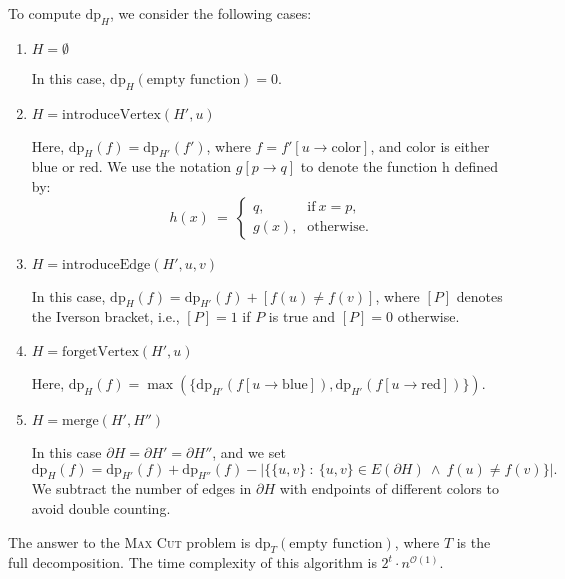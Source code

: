 \documentclass[12pt]{article}
\begin{document}
	\medskip
	
	To compute \(\text{dp}_{H}\), we consider the following cases:
	\begin{enumerate}
		\item \(H = \emptyset\)
		      
		      In this case, \(\text{dp}_{H}(\text{empty function}) = 0\).
		
		\item \(H = \text{introduceVertex}(H', u)\)
		      
		      Here, \(\text{dp}_{H}(f) = \text{dp}_{H'}(f')\), where \(f =
		      f'[u \to \text{color}]\), and color is either blue or red. We use
		      the notation \(g[p \to q]\) to denote the function h defined by:
		      \[ h(x) \ = \ \begin{cases} q \text{,} & \text{if} \ x = p
		      \text{,} \\
		      g(x) \text{,} & \text{otherwise.} \end{cases} \]
		
		\item \(H = \text{introduceEdge}(H', u, v)\)
		      
		      In this case, \(\text{dp}_{H}(f) = \text{dp}_{H'}(f) + [f(u) \neq
		      f(v)]\), where \([P]\) denotes the Iverson bracket, i.e., \([P] =
		      1\) if \(P\) is true and \([P] = 0\) otherwise.
		
		\item \(H = \text{forgetVertex}(H', u)\)
		      
		      Here, \(\text{dp}_{H}(f) = \max(\{
		      \text{dp}_{H'}(f[u \to \text{blue}]),
		      \text{dp}_{H'}(f[u \to \text{red}])\})\).
		
		\item \(H = \text{merge}(H', H'')\)
		      
		      In this case \(\partial H = \partial H' = \partial H''\), and we
		      set
		      \[ \text{dp}_{H}(f) = \text{dp}_{H'}(f) + \text{dp}_{H''}(f) -
		      |\{\{u, v\} \ : \ \{u, v\} \in E(\partial H) \ \wedge \ f(u) \neq
		      f(v)\}| \text{.} \]
		      We subtract the number of edges in \(\partial H\) with endpoints
		      of different colors to avoid double counting.
	\end{enumerate}
	The answer to the \textsc{Max Cut} problem is
	\(\text{dp}_{T}(\text{empty function})\), where \(T\) is the full
	decomposition. The time complexity of this algorithm is \(2^{t} \cdot
	n^{\mathcal{O}(1)}\).
\end{document}
